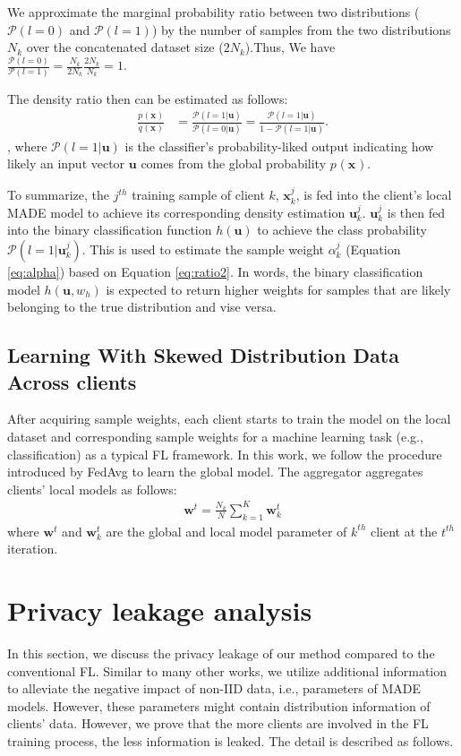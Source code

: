 \documentclass[mathfont=newtx]{uai2023} %
\newcommand{\px}[2]{p_{#1}(\mathbf{x_{#2}})}
\newcommand{\qx}[2]{q_{#1}(\mathbf{x_{#2}})}
\newcommand{\Prob}{\mathcal{P} }
\newcommand{\x}{\mathbf{x}}
\newcommand{\ubold}{\mathbf{u}}
\begin{document}
We approximate the marginal probability ratio between two distributions ( $\Prob(l=0)$  and $\Prob(l=1)$) by the number of samples from the two distributions $N_k$ over the concatenated dataset size ($2N_k$).Thus,  We have
 	$\frac{ \Prob(l=0) }{ \Prob(l=1)  } = \frac{N_k}{2N_k} \frac{2N_k}{N_k}=1. \label{eq:marginalratio}$

The density ratio then can be estimated as follows:
\begin{align}
\frac{\px{}{}}{\qx{}{}} &= \frac{  \Prob(l=1|\ubold )  }{ \Prob(l=0|\ubold )   } 
	= \frac{  \Prob(l=1|\ubold )  }{ 1 - \Prob(l=1|\ubold )   }. \label{eq:ratio2}
\end{align}, 
where $\Prob(l=1|\ubold{})$ is the classifier's probability-liked output indicating how likely an input vector $\ubold$ comes from the global probability $\px{}{}$. 
 
To summarize, the $j^{th}$ training sample of client $k$, $\x_k^j$, is fed into the client's local MADE model to achieve its corresponding density estimation $\ubold{}_k^j$. $\ubold{}_k^j$ is then fed into the binary classification function $h(\ubold)$ to achieve the class probability $ \Prob(l=1|\ubold_k^j ) $. This is used to estimate the sample weight $\alpha_k^j$ (Equation \ref{eq:alpha}) based on Equation \ref{eq:ratio2}. In words, the binary classification model $h(\ubold,w_h)$ is expected to return higher weights for samples that are likely belonging to the true distribution and vise versa. 

\subsection{Learning With Skewed Distribution Data Across clients }
After acquiring sample weights, each client starts to train the model on the local dataset and corresponding sample weights for a machine learning task (e.g., classification) as a typical FL framework. In this work, we follow the procedure introduced by FedAvg to learn the global model. The aggregator aggregates clients' local models as follows:
\begin{equation}
\begin{aligned}
\mathbf{w}^t = \frac{N_k}{N}\sum_{k=1}^{K} \mathbf{w}^t_k 
\end{aligned}
\end{equation}
where $\mathbf{w}^t$ and $\mathbf{w}^t_k$ are the global and local model parameter of $k^{th}$ client at the $t^{th}$ iteration.

\section{Privacy leakage analysis}
\label{sec:privacyAnalysis}
In this section, we discuss the privacy leakage of our method compared to the conventional FL. Similar to many other works, we utilize additional information to alleviate the negative impact of non-IID data, i.e., parameters of MADE models. However, these parameters might contain distribution information of clients’ data. However, we prove that the more clients are involved in the FL training process, the less information is leaked. The detail is described as follows. 
    
\end{document}
